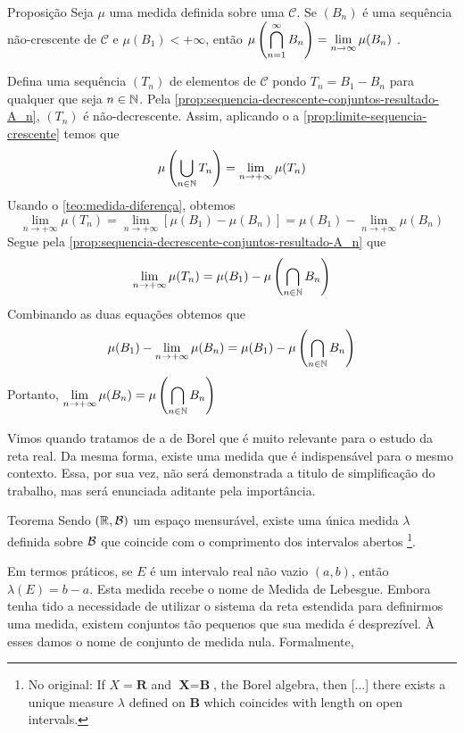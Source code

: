 \begin{env}{Proposição}
Seja $\mu$ uma medida definida sobre uma \sigal $\mathcal{C}$.
Se $(B_n)$ é uma sequência não-crescente de $\mathcal{C}$ e $\mu(B_1) < +\infty$, então 
$\mu\left(\displaystyle \bigcap_{n = 1}^\infty B_n\right) = \displaystyle \lim_{n \to \infty} \mu(B_n)$ \cite{bartle}.
\end{env} 
\begin{prova}
    Defina uma sequência $(T_n)$ de elementos de $\mathcal{C}$ pondo $T_n = B_1 - B_n$ para qualquer que seja $n \in \operatorname{\mathbb{N}}$.
    Pela \ref{prop:sequencia-decrescente-conjuntos-resultado-A_n}, $(T_n)$ é não-decrescente.
    Assim, aplicando o a \ref{prop:limite-sequencia-crescente} temos que 
    $$
    \mu\left(\bigcup_{n \in \operatorname{\mathbb{N}}} T_n\right) = \lim_{n \to +\infty} \mu(T_n)
    $$
    Usando o \ref{teo:medida-diferença}, obtemos
    $$
    \lim_{n \to +\infty} \mu(T_n) = \lim_{n \to +\infty} [\mu(B_1) - \mu(B_n)] = \mu(B_1) - \lim_{n \to +\infty} \mu(B_n)
    $$
    Segue pela \ref{prop:sequencia-decrescente-conjuntos-resultado-A_n} que 
    $$
    \lim_{n \to +\infty} \mu(T_n) = \mu(B_1) - \mu\left(\bigcap_{n \in \operatorname{\mathbb{N}}} B_n\right)
    $$
    Combinando as duas equações obtemos que
    \begin{align*}
        \mu(B_1) - \lim_{n \to +\infty} \mu(B_n) = \mu(B_1) - \mu\left(\bigcap_{n \in \operatorname{\mathbb{N}}} B_n\right)
    \end{align*}
    Portanto, $\displaystyle \lim_{n \to +\infty} \mu(B_n) = \mu\left(\bigcap_{n \in \operatorname{\mathbb{N}}} B_n\right)$
\end{prova}

Vimos quando tratamos de \sigals a \sigal de Borel que é muito relevante para o estudo da reta real.
Da mesma forma, existe uma medida que é indispensável para o mesmo contexto.
Essa, por sua vez, não será demonstrada a titulo de simplificação do trabalho, mas será enunciada aditante pela importância. 
\begin{env}{Teorema}
	\label{teo: medida de lebesgue}
	Sendo $(\mathbb{R}, \operatorname{\mathcal{B}})$ um espaço mensurável, existe uma única medida $\lambda$ definida sobre $\operatorname{\mathcal{B}}$ que coincide com o comprimento dos intervalos abertos \cite[p.20, tradução nossa, adaptação nossa]{bartle}
	\footnote{No original: If $X = \textbf{R}$ and $\textbf{X} = \textbf{B}$, the Borel algebra, then [...] there exists a unique measure $\lambda$ defined on $\textbf{B}$ which coincides with length on open intervals.}.
\end{env}

Em termos práticos, se $E$ é um intervalo real não vazio $(a,b)$, então $\lambda(E) = b - a$.
Esta medida recebe o nome de Medida de Lebesgue. 
Embora tenha tido a necessidade de utilizar o sistema da reta estendida para definirmos uma medida, existem conjuntos tão pequenos que sua medida é desprezível.
À esses damos o nome de conjunto de medida nula.
Formalmente,

